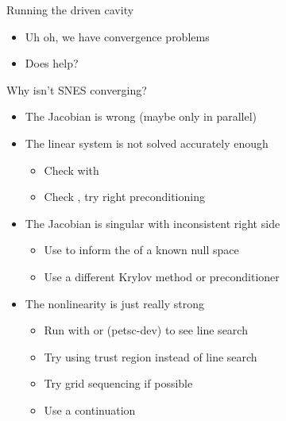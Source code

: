 \begin{frame}[fragile]{Running the driven cavity}
\begin{itemize}
{{  0 SNES Function norm 1.809960438828e+03 \\
  1 SNES Function norm 1.678372489097e+03 \\
  2 SNES Function norm 1.643759853387e+03 \\
  3 SNES Function norm 1.559341161485e+03 \\
  4 SNES Function norm 1.557604282019e+03 \\
  5 SNES Function norm 1.510711246849e+03 \\
  6 SNES Function norm 1.500472491343e+03 \\
  7 SNES Function norm 1.498930951680e+03 \\
  8 SNES Function norm 1.498440256659e+03 \\
  ...
}}
  \item<5-> Uh oh, we have convergence problems
  \item<5-> Does  help?
  \end{itemize}
\end{frame}

\begin{frame}{Why isn't SNES converging?}
  \begin{itemize}
  \item The Jacobian is wrong (maybe only in parallel)
  \item The linear system is not solved accurately enough
    \begin{itemize}
    \item Check with 
    \item Check , try right preconditioning
    \end{itemize}
  \item The Jacobian is singular with inconsistent right side
    \begin{itemize}
    \item Use  to inform the  of a known null space
    \item Use a different Krylov method or preconditioner
    \end{itemize}
  \item The nonlinearity is just really strong
    \begin{itemize}
    \item Run with  or  (petsc-dev) to see line search
    \item Try using trust region instead of line search 
    \item Try grid sequencing if possible
    \item Use a continuation
    \end{itemize}
  \end{itemize}
\end{frame}


